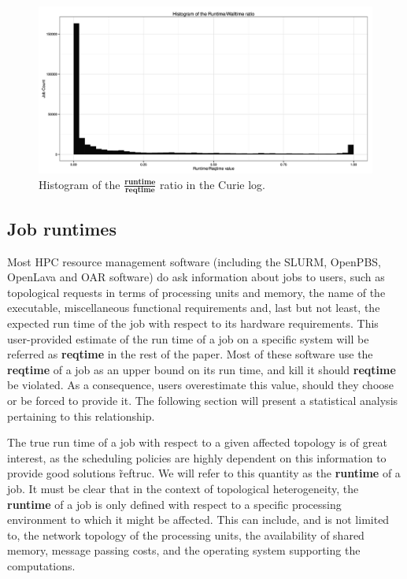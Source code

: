 \documentclass{article}
\begin{document}
\begin{figure}[b]
  \centering
  \includegraphics[width=\textwidth]{../../wallimage-1.png}
  \caption{Histogram of the $\frac{\textbf{runtime}}{\textbf{reqtime}}$ ratio in the Curie log.}
  \label{fig:ratio}
\end{figure}

\subsection{Job runtimes}
Most HPC resource management software (including the SLURM, OpenPBS, OpenLava and OAR software) do ask information about jobs to users, such as topological requests in terms of processing units and memory, the name of the executable, miscellaneous functional requirements and, last but not least, the expected run time of the job with respect to its hardware requirements.
This user-provided estimate of the run time of a job on a specific system will be referred as \textbf{reqtime} in the rest of the paper. Most of these software use the \textbf{reqtime} of a job as an upper bound on its run time, and kill it should \textbf{reqtime} be violated. As a consequence, users overestimate this value, should they choose or be forced to provide it. The following section will present a statistical analysis pertaining to this relationship.

The true run time of a job with respect to a given affected topology is of great interest, as the scheduling policies are highly dependent on this information to provide good solutions \~ref{truc}. We will refer to this quantity as the \textbf{runtime} of a job.
It must be clear that in the context of topological heterogeneity, the \textbf{runtime} of a job is only defined with respect to a specific processing environment to which it might be affected.
This can include, and is not limited to, the network topology of the processing units, the availability of shared memory, message passing costs, and the operating system supporting the computations.
\end{document}
